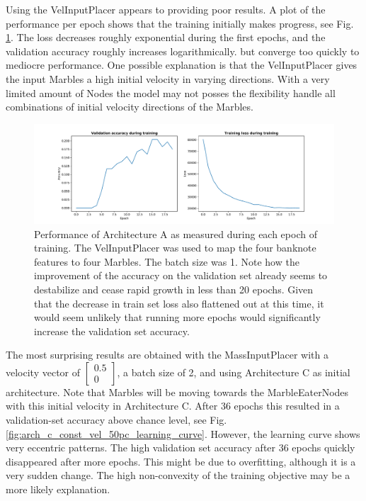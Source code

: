 Using the VelInputPlacer appears to providing poor results. A plot of the performance per epoch shows that the training initially makes progress, see Fig. \ref{fig:velinputplacer_performance}. The loss decreases roughly exponential during the first epochs, and the validation accuracy roughly increases logarithmically. but converge too quickly to mediocre performance. One possible explanation is that the VelInputPlacer gives the input Marbles a high initial velocity in varying directions. With a very limited amount of Nodes the model may not posses the flexibility handle all combinations of initial velocity directions of the Marbles. 

\begin{figure}[hb]
	\centering
	\includegraphics[scale=0.4]{figures/A_batch1_velinputplacer.pdf}
	\caption{Performance of Architecture A as measured during each epoch of training. The VelInputPlacer was used to map the four banknote features to four Marbles. The batch size was 1. Note how the improvement of the accuracy on the validation set already seems to destabilize and cease rapid growth in less than 20 epochs. Given that the decrease in train set loss also flattened out at this time, it would seem unlikely that running more epochs would significantly increase the validation set accuracy.}
	\label{fig:velinputplacer_performance}
\end{figure}

\clearpage

The most surprising results are obtained with the MassInputPlacer with a velocity vector of $\begin{bmatrix} 0.5\\0\end{bmatrix}$, 
a batch size of 2, and using Architecture C as initial architecture. 
Note that Marbles will be moving towards the MarbleEaterNodes with this initial velocity in Architecture C. 
After 36 epochs this resulted in a validation-set accuracy above chance level, see Fig. \ref{fig:arch_c_const_vel_50pc_learning_curve}. 
However, the learning curve shows very eccentric patterns. 
The high validation set accuracy after 36 epochs quickly disappeared after more epochs. 
This might be due to overfitting, although it is a very sudden change. 
The high non-convexity of the training objective may be a more likely explanation. 

